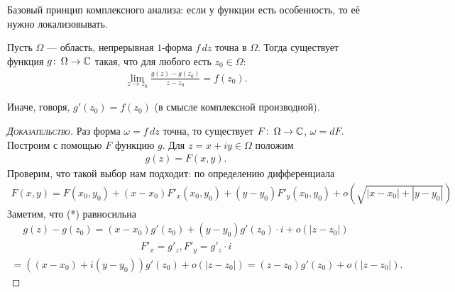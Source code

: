 \documentclass[../../main.tex]{subfiles}
\begin{document}
Базовый принцип комплексного анализа: если у функции есть особенность, то её нужно локализовывать.

\begin{lm}
 Пусть $\Omega$ --- область, непрерывная $1$-форма $f\,dz$ точна в $\Omega$. Тогда существует функция $g \colon\,\Omega\to\mathbb{C}$ такая, что для любого есть $z_0 \in \Omega$:
 \begin{align*}
  \lim_{z \to z_0} \frac{g(z)-g(z_0)}{z-z_0} = f(z_0)
 .\end{align*} 

 Иначе, говоря, $g'(z_0) = f(z_0)$ (в смысле комплексной производной).
\end{lm}
\begin{proof}[\normalfont\textsc{Доказательство}]
 Раз форма $\omega = f\, dz$ точна, то существует $F \colon\, \Omega \to \mathbb{C} $, $\omega = dF$. Построим с помощью $F$ функцию $g$. Для $z = x+iy \in \Omega$ положим
 \begin{align*}
  g(z) = F(x,y).
 \end{align*} Проверим, что такой выбор нам подходит: по определению дифференциала
 \begin{align}
  F(x,y) = F(x_0, y_0) + (x-x_0) F'_x(x_0, y_0) + (y-y_0)F'_y(x_0,y_0) + o(\sqrt{\left| x-x_0 \right| + \left| y-y_0 \right|})
 \end{align} Заметим, что (*) равносильна
 \begin{align*}
  g(z) - g(z_0) = (x-x_0)g'(z_0) + (y-y_0)g'(z_0) \cdot i + o(\left| z-z_0 \right|)
 \end{align*} 
 \begin{align*}
  F'_x = g'_z, F'_y = g'_z \cdot i
 \end{align*} 
 \begin{align*}
  = ((x-x_0) + i(y-y_0))g'(z_0) + o(\left| z-z_0 \right|) = (z-z_0)g'(z_0) + o(\left| z-z_0 \right|).
 \end{align*} 
\end{proof}
\end{document}
